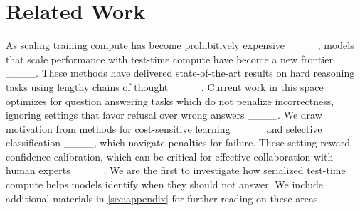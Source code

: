 \section{Related Work}
As scaling training compute has become prohibitively expensive ____, models that scale performance with test-time compute have become a new frontier ____. These methods have delivered state-of-the-art results on hard reasoning tasks using lengthy chains of thought ____. Current work in this space optimizes for question answering tasks which do not penalize incorrectness, ignoring settings that favor refusal over wrong answers ____.
We draw motivation from methods for cost-sensitive learning ____ and selective classification ____, which navigate penalties for failure. These setting reward confidence calibration, which can be critical for effective collaboration with human experts ____. We are the first to investigate how serialized test-time compute helps models identify when they should not answer.
We include additional materials in \cref{sec:appendix} for further reading on these areas.